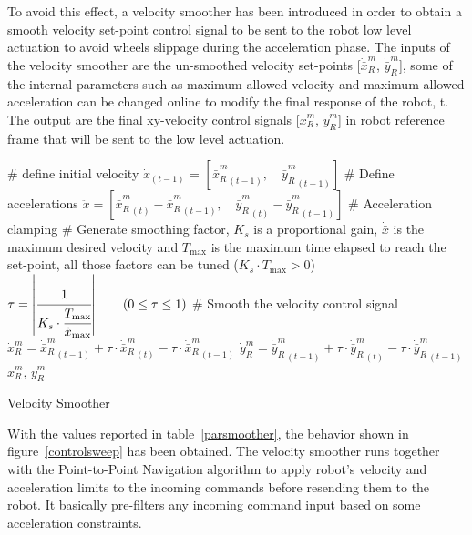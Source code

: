 To avoid this effect, a velocity smoother has been introduced in order to obtain a smooth velocity set-point control signal to be sent to the robot low level actuation to avoid wheels slippage during the  acceleration phase. The inputs of the velocity smoother are the un-smoothed velocity set-points [$\dot{\bar{x}}_R^m$, $\dot{\bar{y}}_R^m$], some of the internal parameters such as maximum allowed velocity and maximum allowed acceleration can be changed online to modify the final response of the robot, t. The output are the final xy-velocity control signals [$\dot{x}_R^m$, $\dot{y}_R^m$] in robot reference frame that will be sent to the low level actuation.

\begin{algorithm}[h]
	\# define initial velocity\;
	$\dot{x}_{(t-1)}$ = $\left[{\dot{\bar{x}}_R^m}_{(t-1)},\quad {\dot{\bar{y}}_R^m}_{(t-1)}\right]$\;
	\# Define accelerations\;
	$\ddot{x}= \left[ {\dot{\bar{x}}_R^m}_{(t)}-{\dot{\bar{x}}_R^m}_{(t-1)},\quad {\dot{\bar{y}}_R^m}_{(t)}-{\dot{\bar{y}}_R^m}_{(t-1)}\right]$\;
	\# Acceleration clamping \;
	\# Generate smoothing factor, $K_s$ is a proportional gain, $\dot{\bar{x}}$ is the maximum desired velocity and $T_\text{max}$ is the maximum time elapsed to reach the set-point, all those factors can be tuned ($K_s\cdot T_\text{max} > 0 $)\;
	$\tau = \left| \cfrac{1}{K_s\cdot\cfrac{T_\text{max}}{\dot{x}_{\text{max}}}}\right|\qquad(0\leq\tau\leq1)$\;
	\# Smooth the velocity control signal\;
	${\dot{x}_R^m} = {\dot{\bar{x}}_R^m}_{(t-1)}+\tau\cdot{\dot{\bar{x}}_R^m}_{(t)}-\tau\cdot{\dot{\bar{x}}_R^m}_{(t-1)}$ \;
	${\dot{y}_R^m} = {\dot{\bar{y}}_R^m}_{(t-1)}+\tau\cdot{\dot{\bar{y}}_R^m}_{(t)}-\tau\cdot{\dot{\bar{y}}_R^m}_{(t-1)}$ \;
	\Return $\dot{x}_R^m$, $\dot{y}_R^m$
	\caption{Velocity Smoother} 
	\label{smoother}
\end{algorithm}

With the values reported in table~\ref{parsmoother}, the behavior shown in figure~\ref{controlsweep} has been obtained. The velocity smoother runs together with the Point-to-Point Navigation algorithm to apply robot's velocity and acceleration limits to the incoming commands before resending them to the robot. It basically pre-filters any incoming command input based on some acceleration constraints. 


